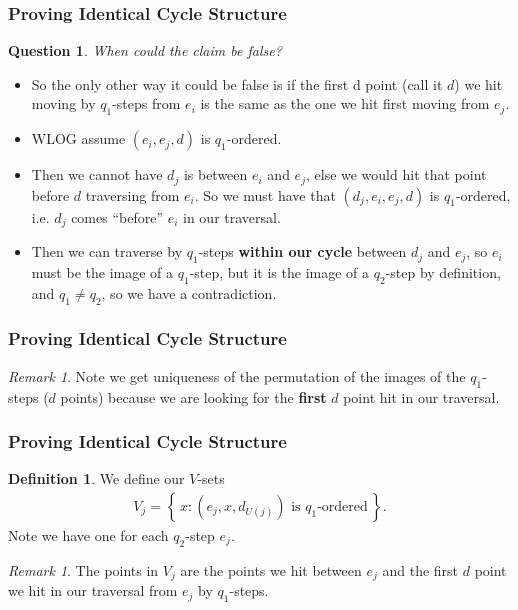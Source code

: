\documentclass{beamer}
\theoremstyle{plain}
\newtheorem{question}[theorem]{Question}
\theoremstyle{definition}
\newtheorem{Def}[theorem]{Definition}
\theoremstyle{remark}
\newtheorem{rem}[theorem]{Remark}
\newcommand{\bee}{\begin{equation}\begin{aligned}}
\newcommand{\eee}{\end{aligned}\end{equation}}
\renewcommand{\'}{\hspace{0.5mm}'}		%
\renewcommand{\Set}[1]{\left\{\,#1\,\right\}}	%
\begin{document}

\begin{frame}
\frametitle{Proving Identical Cycle Structure}

	\begin{question}
		When could the claim be false?
	\end{question}
	
	\begin{itemize}
		\item So the only other way it could be false
		is if 
		the first d point (call it $d$) we hit moving
		by $q_1$-steps from $e_i$
		is the same as the one we hit first moving from $e_j$. 
		\item WLOG assume $(e_i,e_j,d)$ is $q_1$-ordered. 
		\item Then we cannot have $d_j$ is between $e_i$ and 
		$e_j$, else we would hit that
		point before $d$ traversing from $e_i$. So we must have
		that $(d_j,e_i,e_j,d)$ is $q_1$-ordered, i.e. 
		$d_j$ comes ``before'' $e_i$ in our traversal. 
		\item Then
		we can traverse by $q_1$-steps 
		\textbf{within our cycle} between
		$d_j$ and $e_j$, so $e_i$ must 
		be the image of a $q_1$-step, 
		but it is the image of a $q_2$-step by definition, and 
		$q_1 \neq q_2$, so we have a contradiction. 
	\end{itemize}

\end{frame}


\begin{frame}
\frametitle{Proving Identical Cycle Structure}

	\begin{rem}
		Note we get uniqueness of the permutation
		of the images of the $q_1$-steps ($d$ points)
		because we are looking for the \textbf{first}
		$d$ point hit in our traversal. 
	\end{rem}

\end{frame}


\begin{frame}
\frametitle{Proving Identical Cycle Structure}

	\begin{Def}
		We define our $V$-sets
		\bee
			V_j = \Set{x: (e_j,x,d_{U(j)}) 
			\text{ is }q_1\text{-ordered}}. 
		\eee
		Note we have one for each $q_2$-step $e_j$. 
	\end{Def}
	\begin{rem}
		The points in $V_j$ are the points 
		we hit between $e_j$ and the first 
		$d$ point we hit in our traversal from
		$e_j$ by $q_1$-steps. 
	\end{rem}
\end{frame}
\end{document}
